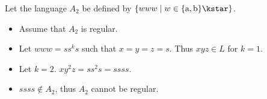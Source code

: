 Let the language $A_2$ be defined by $\{www \mid w \in \{\text{a}, \text{b}\}\kstar \}$.
\begin{itemize}
	\item Assume that $A_2$ is regular.
	\item Let $www = ss^ks$ such that $x = y = z = s$. Thus $xyz \in L$ for $k=1$.
	\item Let $k=2$. $xy^2z = ss^2s = ssss$.
	\item $ssss \notin A_2$, thus $A_2$ cannot be regular.
\end{itemize}